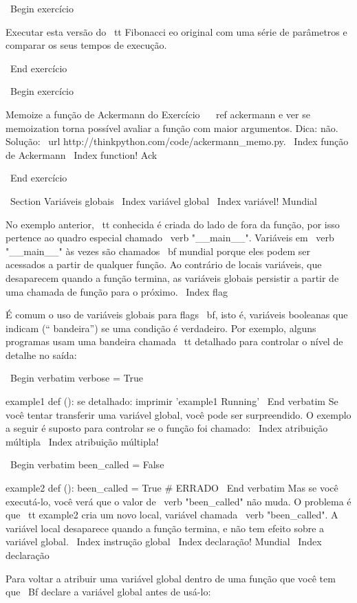 \documentclass[10pt]{book}
\begin{document}
\begin {itemize}
{{{{{{{\ Begin {} exercício

Executar esta versão do {\ tt Fibonacci} eo original com
uma série de parâmetros e comparar os seus tempos de execução.

\ End {} exercício

\ Begin {} exercício

Memoize a função de Ackermann do Exercício ~ \ ref {} ackermann e ver se
memoization torna possível avaliar a função com maior
argumentos. Dica: não.
Solução: \ url {http://thinkpython.com/code/ackermann_memo.py}.
\ Index {função de Ackermann}
\ Index {function! Ack}

\ End {} exercício


\ Section {Variáveis ​​globais}
\ Index {variável global}
\ Index {variável! Mundial}

No exemplo anterior, {\ tt conhecida} é criada do lado de fora da função,
por isso pertence ao quadro especial chamado \ verb "__main__".
Variáveis ​​em \ verb "__main__" às vezes são chamados {\ bf mundial}
porque eles podem ser acessados ​​a partir de qualquer função. Ao contrário de locais
variáveis, que desaparecem quando a função termina, as variáveis ​​globais
persistir a partir de uma chamada de função para o próximo.
\ Index {flag}

É comum o uso de variáveis ​​globais para {flags \ bf}, isto é, 
variáveis ​​booleanas que indicam (`` bandeira'') se uma condição
é verdadeiro. Por exemplo, alguns programas usam
uma bandeira chamada {\ tt detalhado} para controlar o nível de detalhe no
saída:

\ Begin {verbatim}
verbose = True

example1 def ():
    se detalhado:
        imprimir 'example1 Running'
\ End {verbatim}
%
Se você tentar transferir uma variável global, você pode ser surpreendido.
O exemplo a seguir é suposto para controlar se o
função foi chamado:
\ Index {atribuição múltipla}
\ Index {atribuição múltipla!}

\ Begin {verbatim}
been_called = False

example2 def ():
    been_called = True # ERRADO
\ End {verbatim}
%
Mas se você executá-lo, você verá que o valor de \ verb "been_called"
não muda. O problema é que {\ tt example2} cria um novo local,
variável chamada \ verb "been_called". A variável local desaparece quando
a função termina, e não tem efeito sobre a variável global.
\ Index {instrução global}
\ Index {declaração! Mundial}
\ Index {declaração}

Para voltar a atribuir uma variável global dentro de uma função que você tem que
{\ Bf} declare a variável global antes de usá-lo:

}}}}}}}
\end{itemize}
\end{document}
